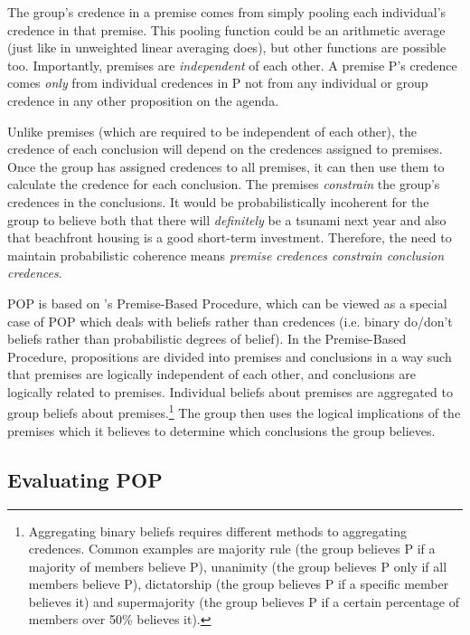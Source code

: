 \documentclass{article}
\begin{document}
The group's credence in a premise comes from simply pooling each individual's credence in that premise. This pooling function could be an arithmetic average (just like in unweighted linear averaging does), but other functions are possible too. Importantly, premises are \textit{independent} of each other. A premise P's credence comes \textit{only} from individual credences in P \textemdash{} not from any individual or group credence in any other proposition on the agenda.

Unlike premises (which are required to be independent of each other), the credence of each conclusion will depend on the credences assigned to premises. Once the group has assigned credences to all premises, it can then use them to calculate the credence for each conclusion. The premises \textit{constrain} the group's credences in the conclusions. It would be probabilistically incoherent for the group to believe both that there will \textit{definitely} be a tsunami next year and also that beachfront housing is a good short-term investment. Therefore, the need to maintain probabilistic coherence means \textit{premise credences constrain conclusion credences}.

POP is based on \citet{list2011group}'s Premise-Based Procedure, which can be viewed as a special case of POP which deals with beliefs rather than credences (i.e. binary do/don't beliefs rather than probabilistic degrees of belief). In the Premise-Based Procedure, propositions are divided into premises and conclusions in a way such that premises are logically independent of each other, and conclusions are logically related to premises. Individual beliefs about premises are aggregated to group beliefs about premises.\footnote{Aggregating binary beliefs requires different methods to aggregating credences. Common examples are majority rule (the group believes P if a majority of members believe P), unanimity (the group believes P only if all members believe P), dictatorship (the group believes P if a specific member believes it) and supermajority (the group believes P if a certain percentage of members over 50\% believes it).} The group then uses the logical implications of the premises which it believes to determine which conclusions the group believes. 

\subsection{Evaluating POP}
\end{document}
